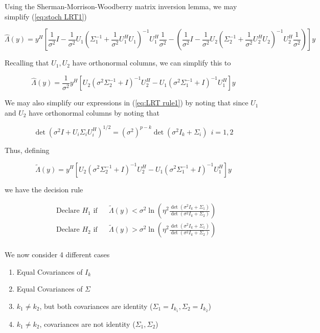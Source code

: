\documentclass[english]{article}
\begin{document}
Using the Sherman-Morrison-Woodberry matrix inversion lemma, we may simplify (\ref{eq:stoch LRT1})

\begin{equation}
\hat{\Lambda}(y)=y^H\left[\frac{1}{\sigma^2}I-\frac{1}{\sigma^2}U_1(\Sigma_1^{-1}+\frac{1}{\sigma^2}U_1^HU_1)^{-1}U_1^H\frac{1}{\sigma^2} - (\frac{1}{\sigma^2}I-\frac{1}{\sigma^2}U_2(\Sigma_2^{-1}+\frac{1}{\sigma^2}U_2^HU_2)^{-1}U_2^H\frac{1}{\sigma^2})\right]y
\end{equation}

Recalling that $U_1,U_2$ have orthonormal columns, we can simplify this to

\begin{equation}
\hat{\Lambda}(y)=\frac{1}{\sigma^2}y^H\left[U_2(\sigma^2\Sigma_2^{-1}+I)^{-1}U_2^H-U_1(\sigma^2\Sigma_1^{-1}+I)^{-1}U_1^H\right]y
\end{equation}

We may also simplify our expressions in (\ref{eq:LRT rule1}) by noting that since $U_1$ and $U_2$ have orthonormal columns by noting that

\begin{equation}
\det(\sigma^2I+U_i\Sigma_iU_i^H)^{1/2} = (\sigma^2)^{p-k}\det(\sigma^2I_k+\Sigma_i)~~i=1,2
\end{equation}

Thus, defining

\begin{equation}\label{eq:LRT}
\tilde{\Lambda}(y)=y^H\left[U_2(\sigma^2\Sigma_2^{-1}+I)^{-1}U_2^H-U_1(\sigma^2\Sigma_1^{-1}+I)^{-1}U_1^H\right]y
\end{equation}

we have the decision rule

\begin{equation}\label{eq:LRT rule2}
\begin{aligned}
&\text{Declare } H_1 \text{ if}
&& \tilde{\Lambda}(y) < \sigma^2\ln\left(\eta^2\frac{\det(\sigma^2I_k+\Sigma_1)}{\det(\sigma^2I_k+\Sigma_2)}\right)\\
& \text{Declare } H_2 \text{ if}
&& \tilde{\Lambda}(y) > \sigma^2\ln\left(\eta^2\frac{\det(\sigma^2I_k+\Sigma_1)}{\det(\sigma^2I_k+\Sigma_2)}\right)\\
\end{aligned}
\end{equation}

We now consider 4 different cases
\begin{enumerate}
\item Equal Covariances of $I_k$
\item Equal Covariances of $\Sigma$
\item $k_1\neq k_2$, but both covariances are identity ($\Sigma_1=I_{k_1}, \Sigma_2=I_{k_2}$)
\item $k_1\neq k_2$, covariances are not identity ($\Sigma_1, \Sigma_2$)
\end{enumerate}
\end{document}
